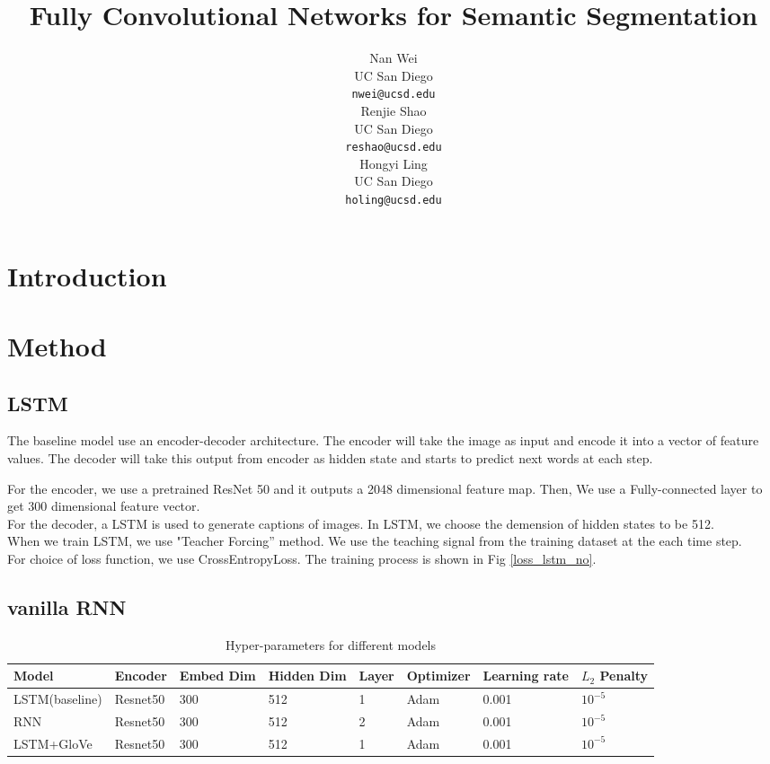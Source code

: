 \documentclass{article} %
\title{Fully Convolutional Networks for Semantic
Segmentation}
\author{
Nan Wei \\
UC San Diego\\
\texttt{nwei@ucsd.edu} \\
\And
Renjie Shao \\
UC San Diego \\
\texttt{reshao@ucsd.edu} \\
\And
Hongyi Ling \\
UC San Diego \\
\texttt{holing@ucsd.edu} \\
}
\begin{document}
\maketitle

\begin{abstract}

\end{abstract}

\section{Introduction}


\section{Method}
\subsection{LSTM}
The baseline model use an encoder-decoder architecture. 
The encoder will take the image as input and encode it into a vector of feature values.
 The decoder will take this output from encoder as hidden state and starts to predict next words at each step.

 For the encoder, we use a pretrained ResNet 50 and it outputs a  2048 dimensional feature map. Then, We use a Fully-connected layer to get 300 dimensional feature vector. \\
 For the decoder, a LSTM is used to generate captions of images. In LSTM, we choose the demension of hidden states to be 512. \\
 When we train LSTM, we use "Teacher Forcing” method. We use the teaching signal from the training dataset at the each time step.\\
 For choice of loss function, we use CrossEntropyLoss. The training process is shown in Fig \ref{loss_lstm_no}.
\subsection{vanilla RNN}

\begin{table}[!htb]
    \centering
    \begin{tabular}{l|l|l|l|l|l|l|l}
        \hline
        Model & Encoder & Embed Dim & Hidden Dim & Layer &  Optimizer & Learning rate & $L_2$ Penalty \\
        \hline
        LSTM(baseline) & Resnet50 &  300& 512 & 1 & Adam & 0.001 & $10^{-5}$ \\
        \hline
        RNN & Resnet50 & 300 & 512 & 2 & Adam & 0.001 & $10^{-5}$ \\
	    \hline
		LSTM+GloVe& Resnet50 & 300 & 512 & 1 & Adam & 0.001 & $10^{-5}$ \\
	    \hline
    \end{tabular}
    \caption{Hyper-parameters for different models}
    \label{acc}
\end{table}
\end{document}
